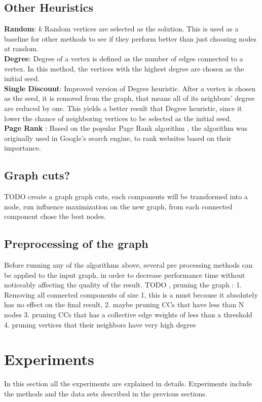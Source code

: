 \documentclass[english]{tktltiki}
\begin{document}
\subsection{Other Heuristics}
\textbf{Random}: $k$ Random vertices are selected as the solution. This is used as a baseline for other methods to see if they perform better than just choosing nodes at random. \\
\textbf{Degree}: Degree of a vertex is defined as the number of edges connected to a vertex. In this method, the vertices with the highest degree are chosen as the initial seed. \\ 
\textbf{Single Discount}: Improved version of Degree heuristic. After a vertex is chosen as the seed, it is removed from the graph, that means all of its neighbors' degree are reduced by one. This yields a better result that Degree heuristic, since it lower the chance of neighboring vertices to be selected as the initial seed. \\ 
\textbf {Page Rank} : Based on the popular Page Rank algorithm \cite{page99}, the algorithm was originally used in Google's search engine, to rank websites based on their importance. 

\subsection{Graph cuts?}
TODO
create a graph graph cuts, each components will be transformed into a node, run influence maximization on the new graph, from each connected component chose the best nodes.

\subsection{Preprocessing of the graph}
Before running any of the algorithms above, several pre processing methods can be applied to the input graph, in order to decrease performance time without noticeably affecting the quality of the result. 
TODO , pruning the graph : 
1. Removing all connected components of size 1, this is a must because it absolutely has no effect on the final result, 
2. maybe pruning CCs that have less than N nodes
3. pruning CCs that has a collective edge weights of less than a threshold
4. pruning vertices that their neighbors have very high degree

\newpage


\section{Experiments}
In this section all the experiments are explained in details. Experiments include the methods and the data sets described in the previous sections. 
\end{document}
